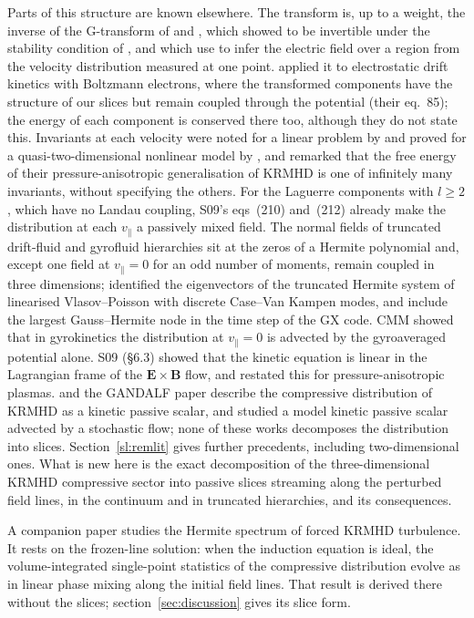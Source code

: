 Parts of this structure are known elsewhere. The transform is, up to a weight, the inverse of the G-transform of \citet{MorrisonPfirsch1992} and \citet{Morrison1994}, which \citet{Morrison2000} showed to be invertible under the stability condition of \citet{Penrose1960}, and which \citet{SkiffHowes2024} use to infer the electric field over a region from the velocity distribution measured at one point. \citet{Heninger2018} applied it to electrostatic drift kinetics with Boltzmann electrons, where the transformed components have the structure of our slices but remain coupled through the potential (their eq.~85); the energy of each component is conserved there too, although they do not state this. Invariants at each velocity were noted for a linear problem by \citet{PlunkParker2014} and proved for a quasi-two-dimensional nonlinear model by \citet{Plunk2015}, and \citet[\S5.1]{Kunz2015} remarked that the free energy of their pressure-anisotropic generalisation of KRMHD is one of infinitely many invariants, without specifying the others. For the Laguerre components with $l\ge2$, which have no Landau coupling, S09's eqs~(210) and~(212) already make the distribution at each $v_\parallel$ a passively mixed field. The normal fields of truncated drift-fluid and gyrofluid hierarchies \citep{Tassi2015,Tassi2017,Tassi2019,Tassi2023} sit at the zeros of a Hermite polynomial \citep{Tassi2022} and, except one field at $v_\parallel=0$ for an odd number of moments, remain coupled in three dimensions; \citet{ParkerDellar2015} identified the eigenvectors of the truncated Hermite system of linearised Vlasov--Poisson with discrete Case--Van Kampen modes, and \citet{Mandell2024} include the largest Gauss--Hermite node in the time step of the GX code. CMM showed that in gyrokinetics the distribution at $v_\parallel=0$ is advected by the gyroaveraged potential alone. S09 (\S6.3) showed that the kinetic equation is linear in the Lagrangian frame of the $\boldsymbol E\times\boldsymbol B$ flow, and \citet{Kunz2015} restated this for pressure-anisotropic plasmas. \citet{KanekarThesis2015} and the GANDALF paper \citep{Kanekar2025} describe the compressive distribution of KRMHD as a kinetic passive scalar, and \citet{Kanekar2014APS} studied a model kinetic passive scalar advected by a stochastic flow; none of these works decomposes the distribution into slices. Section~\ref{sl:remlit} gives further precedents, including two-dimensional ones. What is new here is the exact decomposition of the three-dimensional KRMHD compressive sector into passive slices streaming along the perturbed field lines, in the continuum and in truncated hierarchies, and its consequences.

A companion paper \citep{KanekarPrep} studies the Hermite spectrum of forced KRMHD turbulence. It rests on the frozen-line solution: when the induction equation is ideal, the volume-integrated single-point statistics of the compressive distribution evolve as in linear phase mixing along the initial field lines. That result is derived there without the slices; section~\ref{sec:discussion} gives its slice form.
